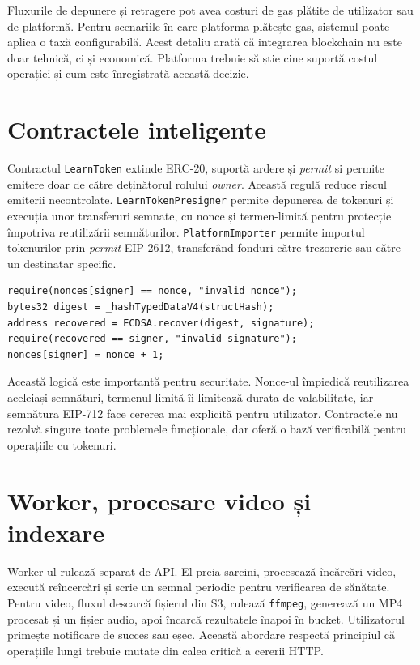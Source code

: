 Fluxurile de depunere și retragere pot avea costuri de gas plătite de utilizator sau de platformă. Pentru scenariile în care platforma plătește gas, sistemul poate aplica o taxă configurabilă. Acest detaliu arată că integrarea blockchain nu este doar tehnică, ci și economică. Platforma trebuie să știe cine suportă costul operației și cum este înregistrată această decizie.

\section{Contractele inteligente}
Contractul \texttt{LearnToken} extinde ERC-20, suportă ardere și \textit{permit} și permite emitere doar de către deținătorul rolului \textit{owner}. Această regulă reduce riscul emiterii necontrolate. \texttt{LearnTokenPresigner} permite depunerea de tokenuri și execuția unor transferuri semnate, cu nonce și termen-limită pentru protecție împotriva reutilizării semnăturilor. \texttt{PlatformImporter} permite importul tokenurilor prin \textit{permit} EIP-2612, transferând fonduri către trezorerie sau către un destinatar specific.

\begin{lstlisting}[style=cod,caption={Fragment conceptual al transferului semnat.},label={lst:presigner}]
require(nonces[signer] == nonce, "invalid nonce");
bytes32 digest = _hashTypedDataV4(structHash);
address recovered = ECDSA.recover(digest, signature);
require(recovered == signer, "invalid signature");
nonces[signer] = nonce + 1;
\end{lstlisting}

Această logică este importantă pentru securitate. Nonce-ul împiedică reutilizarea aceleiași semnături, termenul-limită îi limitează durata de valabilitate, iar semnătura EIP-712 face cererea mai explicită pentru utilizator. Contractele nu rezolvă singure toate problemele funcționale, dar oferă o bază verificabilă pentru operațiile cu tokenuri.

\section{Worker, procesare video și indexare}
Worker-ul rulează separat de API. El preia sarcini, procesează încărcări video, execută reîncercări și scrie un semnal periodic pentru verificarea de sănătate. Pentru video, fluxul descarcă fișierul din S3, rulează \texttt{ffmpeg}, generează un MP4 procesat și un fișier audio, apoi încarcă rezultatele înapoi în bucket. Utilizatorul primește notificare de succes sau eșec. Această abordare respectă principiul că operațiile lungi trebuie mutate din calea critică a cererii HTTP.

